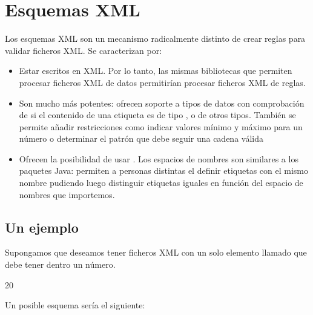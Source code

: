 \documentclass[letterpaper,10pt,spanish]{sphinxmanual}
\begin{document}
\section{Esquemas XML}
\label{\detokenize{tema5:esquemas-xml}}
Los esquemas XML son un mecanismo radicalmente distinto de crear reglas para validar ficheros XML. Se caracterizan por:
\begin{itemize}
\item {} 
Estar escritos en XML. Por lo tanto, las mismas bibliotecas que permiten procesar ficheros XML de datos permitirían procesar ficheros XML de reglas.

\item {} 
Son mucho más potentes: ofrecen soporte a tipos de datos con comprobación de si el contenido de una etiqueta es de tipo ,  o de otros tipos. También se permite añadir restricciones como indicar valores mínimo y máximo para un número o determinar el patrón que debe seguir una cadena válida

\item {} 
Ofrecen la posibilidad de usar . Los espacios de nombres son similares a los paquetes Java: permiten a personas distintas el definir etiquetas con el mismo nombre pudiendo luego distinguir etiquetas iguales en función del espacio de nombres que importemos.

\end{itemize}


\subsection{Un ejemplo}
\label{\detokenize{tema5:un-ejemplo}}
Supongamos que deseamos tener ficheros XML con un solo elemento llamado  que debe tener dentro un número.

\begin{sphinxVerbatim}[commandchars=\\\{\}]
20
\end{sphinxVerbatim}

Un posible esquema sería el siguiente:

\begin{sphinxVerbatim}[commandchars=\\\{\}]
 
     
\end{sphinxVerbatim}
\end{document}
